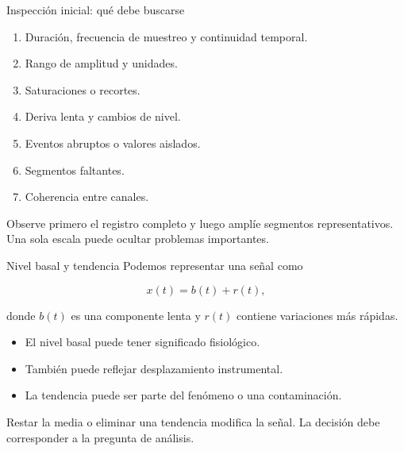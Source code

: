 \documentclass[
  ignorenonframetext,
  aspectratio=169,
  spanish,
  professionalfonts]{beamer}
\providecommand{\tightlist}{%
  \setlength{\itemsep}{0pt}\setlength{\parskip}{0pt}}
\begin{document}
\begin{frame}{Inspección inicial: qué debe buscarse}
\protect{}\label{inspecciuxf3n-inicial-quuxe9-debe-buscarse}
\begin{enumerate}
\tightlist
\item
  Duración, frecuencia de muestreo y continuidad temporal.
\item
  Rango de amplitud y unidades.
\item
  Saturaciones o recortes.
\item
  Deriva lenta y cambios de nivel.
\item
  Eventos abruptos o valores aislados.
\item
  Segmentos faltantes.
\item
  Coherencia entre canales.
\end{enumerate}

\begin{tcolorbox}[enhanced jigsaw, arc=.35mm, bottomrule=.15mm, bottomtitle=1mm, breakable, colback=white, colbacktitle=quarto-callout-tip-color!10!white, colframe=quarto-callout-tip-color-frame, coltitle=black, left=2mm, leftrule=.75mm, opacityback=0, opacitybacktitle=0.6, rightrule=.15mm, title={Práctica recomendable}, titlerule=0mm, toprule=.15mm, toptitle=1mm]

Observe primero el registro completo y luego amplíe segmentos
representativos. Una sola escala puede ocultar problemas importantes.

\end{tcolorbox}
\end{frame}

\begin{frame}{Nivel basal y tendencia}
\protect{}\label{nivel-basal-y-tendencia}
Podemos representar una señal como

\[
x(t)=b(t)+r(t),
\]

donde \(b(t)\) es una componente lenta y \(r(t)\) contiene variaciones
más rápidas.

\begin{itemize}
\tightlist
\item
  El nivel basal puede tener significado fisiológico.
\item
  También puede reflejar desplazamiento instrumental.
\item
  La tendencia puede ser parte del fenómeno o una contaminación.
\end{itemize}

\begin{tcolorbox}[enhanced jigsaw, arc=.35mm, bottomrule=.15mm, bottomtitle=1mm, breakable, colback=white, colbacktitle=quarto-callout-warning-color!10!white, colframe=quarto-callout-warning-color-frame, coltitle=black, left=2mm, leftrule=.75mm, opacityback=0, opacitybacktitle=0.6, rightrule=.15mm, title={No elimine sin justificar}, titlerule=0mm, toprule=.15mm, toptitle=1mm]

Restar la media o eliminar una tendencia modifica la señal. La decisión
debe corresponder a la pregunta de análisis.

\end{tcolorbox}
\end{frame}
\end{document}
